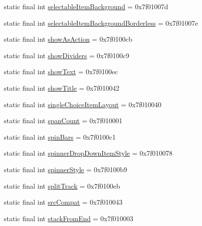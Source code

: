 \begin{CompactItemize}
\item 
static final int \hyperlink{classandroid_1_1support_1_1transition_1_1_r_1_1attr_8e832ee33594a47d054b33973414149e}{selectableItemBackground} = 0x7f01007d
\item 
static final int \hyperlink{classandroid_1_1support_1_1transition_1_1_r_1_1attr_d5e6f6d40ecfa34d2f9b297e27fbe85b}{selectableItemBackgroundBorderless} = 0x7f01007e
\item 
static final int \hyperlink{classandroid_1_1support_1_1transition_1_1_r_1_1attr_e67cf591e07db80247eefe1c0c24a053}{showAsAction} = 0x7f0100cb
\item 
static final int \hyperlink{classandroid_1_1support_1_1transition_1_1_r_1_1attr_63132660ad65a72eac27ed7b0a4a8043}{showDividers} = 0x7f0100c9
\item 
static final int \hyperlink{classandroid_1_1support_1_1transition_1_1_r_1_1attr_1b6397aea01754a237488a261b29d618}{showText} = 0x7f0100ec
\item 
static final int \hyperlink{classandroid_1_1support_1_1transition_1_1_r_1_1attr_c272f28acd342801ae85ed664b31c4c5}{showTitle} = 0x7f010042
\item 
static final int \hyperlink{classandroid_1_1support_1_1transition_1_1_r_1_1attr_cfeda34189d5be15caae4f87c8d6b11f}{singleChoiceItemLayout} = 0x7f010040
\item 
static final int \hyperlink{classandroid_1_1support_1_1transition_1_1_r_1_1attr_3680637cf69658b63889964f48ec793d}{spanCount} = 0x7f010001
\item 
static final int \hyperlink{classandroid_1_1support_1_1transition_1_1_r_1_1attr_6c56c3551f1649bddd844234f3e8ef32}{spinBars} = 0x7f0100c1
\item 
static final int \hyperlink{classandroid_1_1support_1_1transition_1_1_r_1_1attr_3719885efdee999faa85001000097da3}{spinnerDropDownItemStyle} = 0x7f010078
\item 
static final int \hyperlink{classandroid_1_1support_1_1transition_1_1_r_1_1attr_1f34f9cdff90b0f5572649318645194b}{spinnerStyle} = 0x7f0100b9
\item 
static final int \hyperlink{classandroid_1_1support_1_1transition_1_1_r_1_1attr_9eed64a652cb1a7a5f5a060e51c1bad8}{splitTrack} = 0x7f0100eb
\item 
static final int \hyperlink{classandroid_1_1support_1_1transition_1_1_r_1_1attr_00977eeb0bee04e4450d85693f94e433}{srcCompat} = 0x7f010043
\item 
static final int \hyperlink{classandroid_1_1support_1_1transition_1_1_r_1_1attr_fdfdb200da6eedfc3080568638598e8a}{stackFromEnd} = 0x7f010003

\end{CompactItemize}
